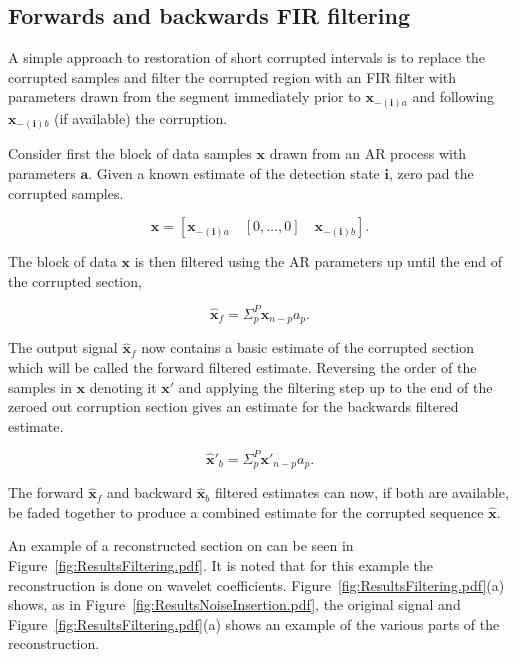 \subsection{Forwards and backwards FIR filtering}
A simple approach to restoration of short corrupted intervals is to replace the corrupted samples and filter the corrupted region with an FIR filter with parameters drawn from the segment immediately prior to $\boldsymbol{x}_{\boldsymbol{-(i)}a}$ and following $\boldsymbol{x}_{\boldsymbol{-(i)}b}$ (if available) the corruption.

Consider first the block of data samples $\boldsymbol{x}$ drawn from an AR process with parameters $\boldsymbol{a}$. Given a known estimate of the detection state $\boldsymbol{i}$, zero pad the corrupted samples.

\begin{equation}\label{eq:RestBasicModelFilterZeros}
\boldsymbol{x} = \left[ \boldsymbol{x}_{\boldsymbol{-(i)}a}\quad \left[0,\ldots,0\right] \quad\boldsymbol{x}_{\boldsymbol{-(i)}b} \right].
\end{equation}

The block of data $\boldsymbol{x}$ is then filtered using the AR parameters up until the end of the corrupted section,

\begin{equation}\label{eq:RestBasicModelFilterEQ}
\boldsymbol{\hat{x}}_f = \Sigma_p^P \boldsymbol{x}_{n-p}a_p.
\end{equation}

The output signal $\boldsymbol{\hat{x}}_f$ now contains a basic estimate of the corrupted section which will be called the forward filtered estimate. Reversing the order of the samples in $\boldsymbol{x}$ denoting it $\boldsymbol{x'}$ and applying the filtering step up to the end of the zeroed out corruption section gives an estimate for the backwards filtered estimate.

\begin{equation}\label{eq:RestBasicModelFilterEQR}
\boldsymbol{\hat{x}'}_b = \Sigma_p^P \boldsymbol{x'}_{n-p}a_p.
\end{equation}

The forward $\boldsymbol{\hat{x}}_f$ and backward $\boldsymbol{\hat{x}}_b$ filtered estimates can now, if both are available, be faded together to produce a combined estimate for the corrupted sequence $\boldsymbol{\hat{x}}$.

An example of a reconstructed section on can be seen in Figure~\ref{fig:ResultsFiltering.pdf}. It is noted that for this example the reconstruction is done on wavelet coefficients. Figure~\ref{fig:ResultsFiltering.pdf}(a) shows, as in Figure~\ref{fig:ResultsNoiseInsertion.pdf}, the original signal and Figure~\ref{fig:ResultsFiltering.pdf}(a) shows an example of the various parts of the reconstruction.

